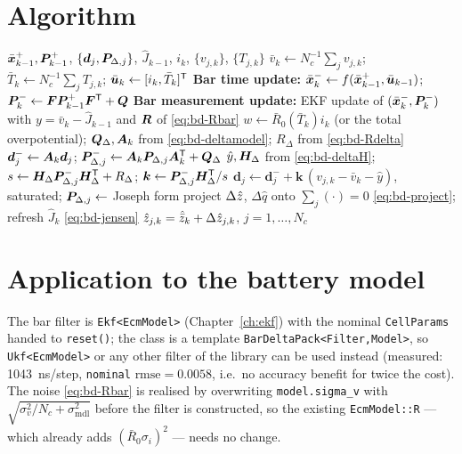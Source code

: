 \section{Algorithm}
\begin{algorithm}[H]
\caption{BarDelta --- one sampling period $k$ (module of $N_c$ cells)}
\begin{algorithmic}[1]
\Require $\bar{\bm{x}}^+_{k-1},\bm{P}^{+}_{k-1}$, $\{\bm{d}_j,\bm{P}_{\Delta,j}\}$, $\hat J_{k-1}$, $i_k$, $\{v_{j,k}\}$, $\{T_{j,k}\}$
\State $\bar v_k \gets N_c^{-1}\sum_j v_{j,k}$;\; $\bar T_k \gets N_c^{-1}\sum_j T_{j,k}$;\; $\bar{\bm{u}}_k \gets [i_k,\bar T_k]^{\mathsf{T}}$
\State \textbf{Bar time update:} $\bar{\bm{x}}^-_k\gets f(\bar{\bm{x}}^+_{k-1},\bar{\bm{u}}_{k-1})$;\;
       $\bm{P}^{-}_k\gets\bm{F}\bm{P}^{+}_{k-1}\bm{F}^{\mathsf{T}}+\bm{Q}$
\State \textbf{Bar measurement update:} EKF update of $(\bar{\bm{x}}^-_k,\bm{P}^{-}_k)$ with
       $y = \bar v_k - \hat J_{k-1}$ and $\bm{R}$ of \eqref{eq:bd-Rbar}
 
  \State $w \gets \bar R_0(\bar T_k) i_k$ (or the total overpotential);\;
         $\bm{Q}_\Delta,\bm{A}_k$ from \eqref{eq:bd-deltamodel};\; $R_\Delta$ from \eqref{eq:bd-Rdelta}
    \State $\bm{d}_j^-\gets\bm{A}_k\bm{d}_j$;\; $\bm{P}^-_{\Delta,j}\gets\bm{A}_k\bm{P}_{\Delta,j}\bm{A}_k^{\mathsf{T}}+\bm{Q}_\Delta$
    \State $\hat y,\bm{H}_\Delta$ from \eqref{eq:bd-deltaH};\;
           $s\gets\bm{H}_\Delta\bm{P}^-_{\Delta,j}\bm{H}_\Delta^{\mathsf{T}}+R_\Delta$;\;
           $\bm{k}\gets\bm{P}^-_{\Delta,j}\bm{H}_\Delta^{\mathsf{T}}/s$
    \State $\bm{d}_j\gets\bm{d}_j^- + \bm{k}\,(v_{j,k}-\bar v_k-\hat y)$, saturated;\;
           $\bm{P}_{\Delta,j}\gets$ Joseph form
  \EndFor
  \State project $\Delta\hat{z}$, $\Delta\hat q$ onto $\textstyle\sum_j(\cdot)=0$ \eqref{eq:bd-project};\;
         refresh $\hat J_k$ \eqref{eq:bd-jensen}
\EndIf
\Ensure $\hat{z}_{j,k} = \hat{\bar{z}}_k + \Delta\hat{z}_{j,k}$, $j = 1,\dots,N_c$
\end{algorithmic}
\end{algorithm}

\section{Application to the battery model}
The bar filter is \texttt{Ekf<EcmModel>} (Chapter~\ref{ch:ekf}) with the nominal
\texttt{CellParams} handed to \texttt{reset()}; the class is a template
\texttt{BarDeltaPack<Filter,Model>}, so \texttt{Ukf<EcmModel>} or any other filter of the library
can be used instead (measured: \SI{1043}{\nano\second}/step, \texttt{nominal}
$\text{rmse}=\num{0.0058}$, i.e.\ no accuracy benefit for twice the cost). The noise
\eqref{eq:bd-Rbar} is realised by overwriting \texttt{model.sigma\_v} with
$\sqrt{\sigma_v^2/N_c + \sigma_{\text{mdl}}^2}$ before the filter is constructed, so the existing
\texttt{EcmModel::R} --- which already adds $(\bar R_0\sigma_i)^2$ --- needs no change.

